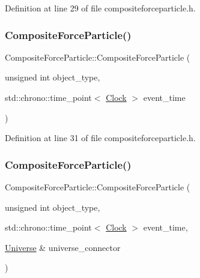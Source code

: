 Definition at line 29 of file compositeforceparticle.\+h.

\mbox{\label{class_composite_force_particle_a805886058bba3179de8142fd266883e4}} 
\subsubsection{\texorpdfstring{Composite\+Force\+Particle()}{CompositeForceParticle()}\hspace{0.1cm}{\footnotesize\ttfamily [3/4]}}
{\footnotesize\ttfamily Composite\+Force\+Particle\+::\+Composite\+Force\+Particle (\begin{DoxyParamCaption}\item[{unsigned int}]{object\+\_\+type,  }\item[{std\+::chrono\+::time\+\_\+point$<$ \mbox{\hyperlink{universe_8h_a0ef8d951d1ca5ab3cfaf7ab4c7a6fd80}{Clock}} $>$}]{event\+\_\+time }\end{DoxyParamCaption})\hspace{0.3cm}{\ttfamily [inline]}}



Definition at line 31 of file compositeforceparticle.\+h.

\mbox{\label{class_composite_force_particle_a8c311b3e35f6def3a532346a50c15281}} 
\subsubsection{\texorpdfstring{Composite\+Force\+Particle()}{CompositeForceParticle()}\hspace{0.1cm}{\footnotesize\ttfamily [4/4]}}
{\footnotesize\ttfamily Composite\+Force\+Particle\+::\+Composite\+Force\+Particle (\begin{DoxyParamCaption}\item[{unsigned int}]{object\+\_\+type,  }\item[{std\+::chrono\+::time\+\_\+point$<$ \mbox{\hyperlink{universe_8h_a0ef8d951d1ca5ab3cfaf7ab4c7a6fd80}{Clock}} $>$}]{event\+\_\+time,  }\item[{\mbox{\hyperlink{class_universe}{Universe}} \&}]{universe\+\_\+connector }\end{DoxyParamCaption})\hspace{0.3cm}{\ttfamily [inline]}}



